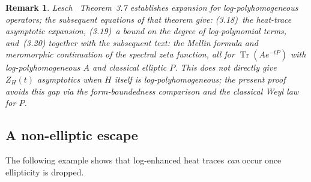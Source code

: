 \documentclass[12pt]{amsart}
\newtheorem{remark}[theorem]{Remark}
\begin{document}
\begin{remark}
\label{rem:lesch}
Lesch~\cite{Lesch1999} Theorem~3.7 establishes
expansion for log-polyhomogeneous operators; the subsequent equations
of that theorem give: (3.18)~the heat-trace asymptotic expansion,
(3.19)~a bound on the degree of log-polynomial terms,
and~(3.20) together with the subsequent text: the Mellin formula and
meromorphic continuation of the spectral zeta function, all for
$\operatorname{Tr}(Ae^{-tP})$ with log-polyhomogeneous $A$ and
classical elliptic $P$.  This does not directly give $Z_H(t)$
asymptotics when $H$ itself is log-polyhomogeneous; the present proof
avoids this gap via the form-boundedness comparison and the classical
Weyl law for $P$.
\end{remark}

\subsection{A non-elliptic escape}

The following example shows that log-enhanced heat traces \emph{can}
occur once ellipticity is dropped.
\end{document}
